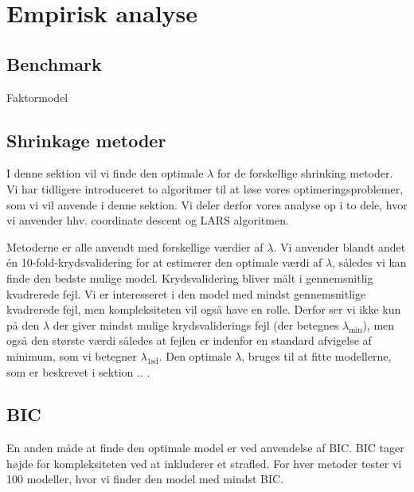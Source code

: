 \chapter{Empirisk analyse}
 
\section{Benchmark}
Faktormodel


\section{Shrinkage metoder}
I denne sektion vil vi finde den optimale $\lambda$ for de forskellige shrinking metoder. 
Vi har tidligere introduceret to algoritmer til at løse vores optimeringsproblemer, som vi vil anvende i denne sektion.
Vi deler derfor vores analyse op i to dele, hvor vi anvender hhv. coordinate descent og LARS algoritmen.

Metoderne er alle anvendt med forskellige værdier af $\lambda$. 
Vi anvender blandt andet én 10-fold-krydsvalidering for at estimerer den optimale værdi af $\lambda$, således vi kan finde den bedste mulige model. 
Krydsvalidering bliver målt i gennemsnitlig kvadrerede fejl. 
Vi er interesseret i den model med mindst gennemsnitlige kvadrerede fejl, men kompleksiteten vil også have en rolle.
Derfor ser vi ikke kun på den $\lambda$ der giver mindst mulige krydsvaliderings fejl (der betegnes $\lambda_{\min}$), men også den største værdi således at fejlen er indenfor en standard afvigelse af minimum, som vi betegner $\lambda_{\text{1sd}}$.  
Den optimale $\lambda$, bruges til at fitte modellerne, som er beskrevet i sektion .. .  





\section{BIC}
En anden måde at finde den optimale model er ved anvendelse af BIC. 
BIC tager højde for kompleksiteten ved at inkluderer et strafled.
For hver metoder tester vi 100 modeller, hvor vi finder den model med mindst BIC. 

